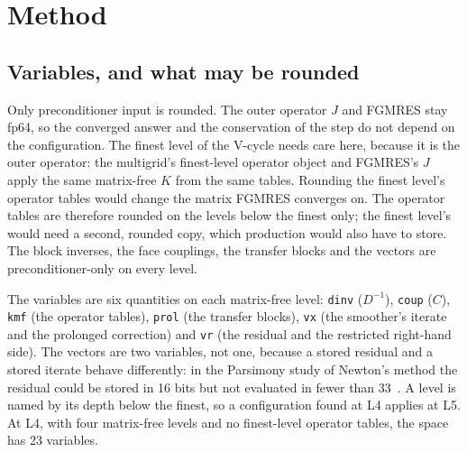 \documentclass[11pt]{article}
\newcommand{\code}[1]{\texttt{#1}}
\begin{document}
\section{Method}
\label{sec:method}

\subsection{Variables, and what may be rounded}
\label{sec:variables}
Only preconditioner input is rounded.  The outer operator $J$ and FGMRES stay fp64, so the
converged answer and the conservation of the step do not depend on the configuration.  The
finest level of the V-cycle needs care here, because it is the outer operator: the multigrid's
finest-level operator object and FGMRES's $J$ apply the same matrix-free $K$ from the same
tables.  Rounding the finest level's operator tables would change the matrix FGMRES converges
on.  The operator tables are therefore rounded on the levels below the finest only; the finest
level's would need a second, rounded copy, which production would also have to store.  The
block inverses, the face couplings, the transfer blocks and the vectors are preconditioner-only
on every level.

The variables are six quantities on each matrix-free level: \code{dinv} ($D^{-1}$),
\code{coup} ($C$), \code{kmf} (the operator tables), \code{prol} (the transfer blocks),
\code{vx} (the smoother's iterate and the prolonged correction) and \code{vr} (the residual and
the restricted right-hand side).  The vectors are two variables, not one, because a stored
residual and a stored iterate behave differently: in the Parsimony study of Newton's method the
residual could be stored in 16 bits but not evaluated in fewer than 33~\cite{parsimony}.  A level
is named by its depth below the finest, so a configuration found at L4 applies at L5.  At L4,
with four matrix-free levels and no finest-level operator tables, the space has 23 variables.
\end{document}
